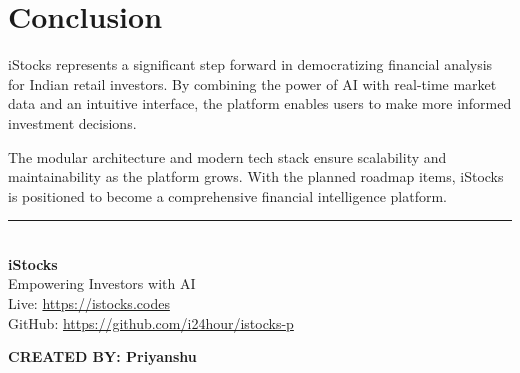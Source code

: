 \documentclass[11pt,a4paper]{article}
\begin{document}
\section{Conclusion}

iStocks represents a significant step forward in democratizing financial analysis for Indian retail investors. By combining the power of AI with real-time market data and an intuitive interface, the platform enables users to make more informed investment decisions.

The modular architecture and modern tech stack ensure scalability and maintainability as the platform grows. With the planned roadmap items, iStocks is positioned to become a comprehensive financial intelligence platform.

\vspace{1cm}

\begin{center}
\rule{0.4\textwidth}{0.5pt}
\end{center}

\vfill

\begin{center}
    \textcolor{primary}{\Large\faChartLine}\\[0.5cm]
    {\large\textbf{iStocks}}\\[0.2cm]
    {\small Empowering Investors with AI}\\[1cm]
    
    \textcolor{textgray}{\small Live: \url{https://istocks.codes}}\\[0.3cm]
    \textcolor{textgray}{\small GitHub: \url{https://github.com/i24hour/istocks-p}}
\end{center}

\vspace{2cm}

\begin{flushright}
    \textbf{CREATED BY: Priyanshu}
\end{flushright}
\end{document}
